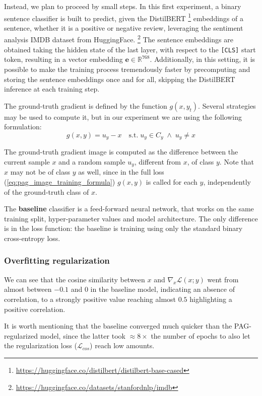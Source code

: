 \documentclass[../thesis.tex]{subfiles}
\begin{document}
Instead, we plan to proceed by small steps.
In this first experiment, a binary sentence classifier is built to predict, given the DistilBERT
\footnote{\url{https://huggingface.co/distilbert/distilbert-base-cased}}
embeddings of a sentence, whether it is a positive or negative review, leveraging the sentiment analysis IMDB dataset from HuggingFace.
\footnote{\url{https://huggingface.co/datasets/stanfordnlp/imdb}}
The sentence embeddings are obtained taking the hidden state of the last layer, with respect to the \texttt{[CLS]} start token, resulting in a vector embedding $\mathbf{e} \in \mathbb{R}^{768}$.
Additionally, in this setting, it is possible to make the training process tremendously faster by precomputing and storing the sentence embeddings once and for all, skipping the DistilBERT inference at each training step.

The ground-truth gradient is defined by the function $g(x, y_t)$.
Several strategies may be used to compute it, but in our experiment we are using the following formulation:
\begin{equation}
    \label{eq:pag_bce_imdb_sentiment_analysis}
    g(x, y) = u_y - x \quad\text{s.t.}\; u_y \in C_y \;\wedge\; u_y \neq x
\end{equation}

The ground-truth gradient image is computed as the difference between the current sample $x$ and a random sample $u_y$, different from $x$, of class $y$. Note that $x$ may not be of class $y$ as well, since in the full loss (\cref{eq:pag_image_training_formula}) $g(x, y)$ is called for each $y$, independently of the ground-truth class of $x$.

The \textbf{baseline} classifier is a feed-forward neural network, that works on the same training split, hyper-parameter values and model architecture. The only difference is in the loss function: the baseline is training using only the standard binary cross-entropy loss.

\subsubsection{Overfitting regularization}
We can see that the cosine similarity between $x$ and $\nabla_x \mathcal{L}(x;y)$ went from almost between $-0.1$ and $0$ in the baseline model, indicating an absence of correlation, to a strongly positive value reaching almost $0.5$ highlighting a positive correlation.

It is worth mentioning that the baseline converged much quicker than the PAG-regularized model,
since the latter took $\approx 8\times$ the number of epochs to also let the regularization loss ($\mathcal{L}_{cos}$) reach low amounts.
\end{document}
